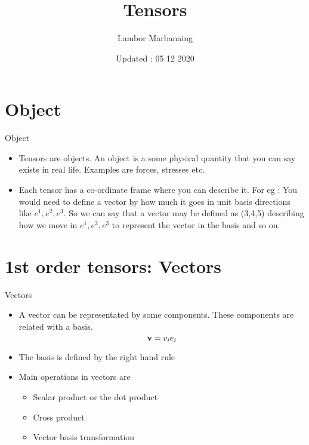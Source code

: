 
\title{Tensors }
\author{Lambor Marbanaing}
\date{Updated : 05 12 2020}
\maketitle
\tableofcontents

\section{Object}
	\begin{frame}{Object}
		\begin{itemize}
			
			\item Tensors are objects. An object is a some physical quantity that you can say exists in real life. Examples are forces, stresses etc.
			
			\item Each tensor has a co-ordinate frame where you can describe it. For eg : You would need to define a vector by how much it goes in unit basis directions like $e^1, e^2, e^3$. So we can say that a vector may be defined as (3,4,5) describing how we move in $e^1, e^2, e^3$ to represent the vector in the basis and so on. 
		\end{itemize}
	\end{frame}
	
\section{1st order tensors: Vectors}
	\begin{frame}{Vectors}
		\begin{itemize}
			\item A vector can be representated by some components. These components are related with a basis.
			\begin{equation}
			   \mathbf{v} = v_i e_i 
			\end{equation}
			\item The basis is defined by the right hand rule
			\item  Main operations in vectors are 
				\begin{itemize}
					\item Scalar product or the dot product
					\item Cross product
					\item Vector basis transformation
					
				\end{itemize}
		\end{itemize}
	\end{frame}


